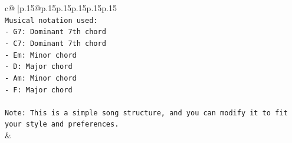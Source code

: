 \documentclass{article}
\begin{document}
{\begin{supertabular}{c@{$\;$}|p{.15\linewidth}@{}p{.15\linewidth}p{.15\linewidth}p{.15\linewidth}p{.15\linewidth}p{.15\linewidth}}
{{{\\ 
\texttt{Musical notation used:} \\
\texttt{{-} G7: Dominant 7th chord} \\
\texttt{{-} C7: Dominant 7th chord} \\
\texttt{{-} Em: Minor chord} \\
\texttt{{-} D: Major chord} \\
\texttt{{-} Am: Minor chord} \\
\texttt{{-} F: Major chord} \\
\\ 
\texttt{Note: This is a simple song structure, and you can modify it to fit your style and preferences.} \\
            }
        }
    }
    & \\ \\


\end{supertabular}}
\end{document}
